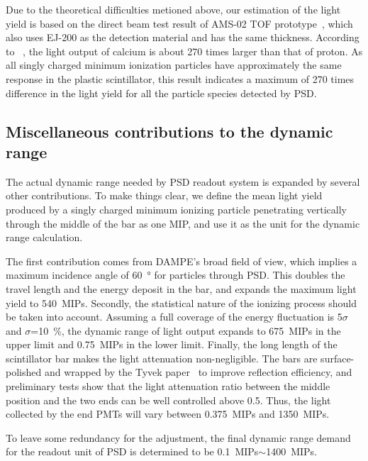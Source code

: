 \documentclass[5p, times]{elsarticle}
\begin{document}
Due to the theoretical difficulties metioned above, our estimation of the light yield is based on the direct beam test result of AMS-02 TOF prototype~\cite{bindi2005performance}, which also uses EJ-200 as the detection material and has the same thickness.
According to ~\cite{bindi2005performance}, the light output of calcium is about 270 times larger than that of proton.
As all singly charged minimum ionization particles have approximately the same response in the plastic scintillator, this result indicates a maximum of 270 times difference in the light yield for all the particle species detected by PSD.

\subsection{Miscellaneous contributions to the dynamic range}
\label{sec:misc_contributions}
The actual dynamic range needed by PSD readout system is expanded by several other contributions. 
To make things clear, we define the mean light yield produced by a singly charged minimum ionizing particle penetrating vertically through the middle of the bar as one MIP, and use it as the unit for the dynamic range calculation.

The first contribution comes from DAMPE's broad field of view, which implies a maximum incidence angle of \SI{60}{\degree} for particles through PSD.
This doubles the travel length and the energy deposit in the bar, and expands the maximum light yield to \SI{540}{MIPs}.  
Secondly, the statistical nature of the ionizing process should be taken into account.
Assuming a full coverage of the energy fluctuation is 5$\sigma$ and $\sigma$=\SI{10}{\percent}, the dynamic range of light output expands to \SI{675}{MIPs} in the upper limit and \SI{0.75}{MIPs} in the lower limit. 
Finally, the long length of the scintillator bar makes the light attenuation non-negligible.
The bars are surface-polished and wrapped by the Tyvek paper~\cite{tyvek} to improve reflection efficiency, and preliminary tests show that the light attenuation ratio between the middle position and the two ends can be well controlled above 0.5.
Thus, the light collected by the end PMTs will vary between \SI{0.375}{MIPs} and \SI{1350}{MIPs}.

To leave some redundancy for the adjustment, the final dynamic range demand for the readout unit of PSD is determined to be \SI{0.1}{MIPs}$\sim$\SI{1400}{MIPs}.
\end{document}
